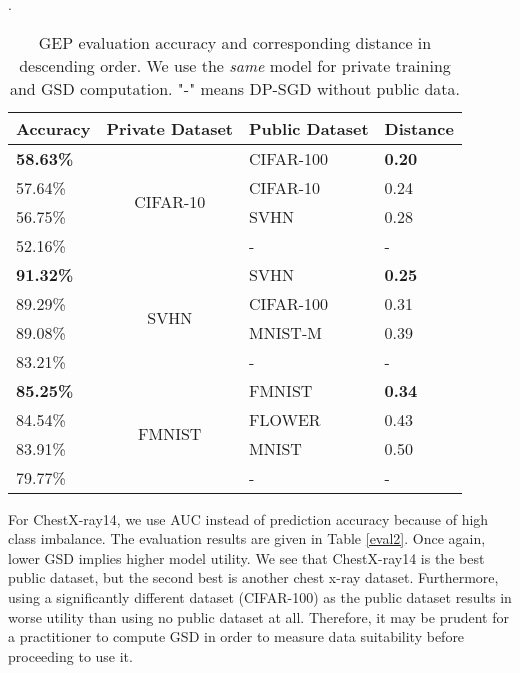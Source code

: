 \documentclass[11pt]{article}
\begin{document}
\begin{table}[!h]
 \caption{GEP evaluation accuracy and corresponding distance in descending order. We use the \emph{{same}} model for private training and GSD computation. "-" means DP-SGD without public data.}.
 \centering
    \begin{tabular}{lcll}
        \toprule
        Accuracy & Private Dataset           & Public Dataset & Distance \\ \hline
        \textbf{58.63\%}  & \multirow{4}{*}{CIFAR-10} & CIFAR-100      & \textbf{0.20}     \\ \cline{1-1} \cline{3-4} 
        57.64\%  &                           & CIFAR-10       & 0.24     \\ \cline{1-1} \cline{3-4} 
        56.75\%  &                           & SVHN           & 0.28     \\ \cline{1-1} \cline{3-4} 
        52.16\%  &                           & -              & -        \\ \hline
        \textbf{91.32\%}  & \multirow{4}{*}{SVHN}     & SVHN           & \textbf{0.25}     \\ \cline{1-1} \cline{3-4} 
        89.29\%  &                           & CIFAR-100      & 0.31     \\ \cline{1-1} \cline{3-4} 
        89.08\%  &                           & MNIST-M        & 0.39     \\ \cline{1-1} \cline{3-4} 
        83.21\%  &                           & -              & -        \\ \hline
        \textbf{85.25\%}  & \multirow{4}{*}{FMNIST}   & FMNIST         & \textbf{0.34}     \\ \cline{1-1} \cline{3-4} 
        84.54\%  &                           & FLOWER         & 0.43     \\ \cline{1-1} \cline{3-4} 
        83.91\%  &                           & MNIST          & 0.50     \\ \cline{1-1} \cline{3-4} 
        79.77\%  &                           & -              & -        \\ 
        \bottomrule
    \end{tabular}
\label{eval1}
\end{table}


For ChestX-ray14, we use AUC instead of prediction accuracy because of high class imbalance.
The evaluation results are given in Table \ref{eval2}.
Once again, lower GSD implies higher model utility.
We see that ChestX-ray14 is the best public dataset, but the second best is another chest x-ray dataset.
Furthermore, using a significantly different dataset (CIFAR-100) as the public dataset results in worse utility than using no public dataset at all.
Therefore, it may be prudent for a practitioner to compute GSD in order to measure data suitability before proceeding to use it. 
\end{document}
